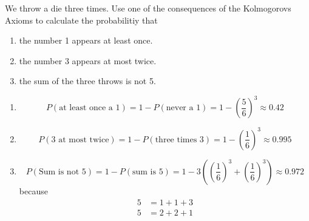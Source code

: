 \documentclass[twoside,11pt,a4paper]{article}
\newif\ifEN \ENtrue	                %
\def\tr|#1|#2|{\ifEN #2\else #1\fi}     %
\theoremstyle{definition}
\newcounter{exc}
\def\answerline#1{%
   \ifhmode\\[1ex]\fcolorbox{solbox}{solbox}{\hbox to \linewidth{\vbox to #1\baselineskip{}}}%
   \else\fcolorbox{solbox}{solbox}{\hbox to \linewidth{\vbox to #1\baselineskip{}}}%
   \fi
 }
\begin{document}
\begin{xxwrap}
\begin{exc}
\tr|Sie werfen einen Würfel dreimal. Verwenden Sie eine der Konsequenzen aus den Axiomen von Kolmogorov um die folgenden 
    Wahrscheinlichkeiten zu berechnen.
   |We throw a die three times. Use one of the  consequences of the  Kolmogorovs Axioms to calculate the probabilitiy that|
\begin{enumerate}
\item \tr|Die Zahl 1 erscheint mindestens einmal.|the number 1 appears at least once. |
\item \tr|Die Zahl 3 erscheint höchstens zweimal.|the number 3 appears at most twice.|
\item \tr|Die Summe der drei Würfe ist nicht 5.|the sum of the three throws is not 5.  |
\end{enumerate}
\end{exc}
\begin{Answer}
  \begin{enumerate}
  \item
    $$P(\text{\tr|mindestens eine 1|at least once a 1|})=
    1-P(\text{\tr|nie eine 1|never  a 1|})=1-\left(\frac56\right)^3\approx 0.42$$
  \item
    $$P(\text{\tr|3 h\"ochstens zweimal|3 at most twice|})=1-P(\text{\tr|dreimal 3|three times 3|})=1-\left(\frac16\right)^3\approx 0.995$$
  \item 
    $$P(\text{\tr|Summe ist nicht 5|Sum is not 5|})=1-P(\text{\tr|Summe ist 5|sum is 5|})=1-3\left(\left(\frac16\right)^3+\left(\frac16\right)^3\right)\approx 0.972$$
    \tr|weil|because |
    \begin{align*}
     5&=1+1+3\\ 
     5&=2+2+1 
    \end{align*}
  \end{enumerate}
\end{Answer}
\answerline{12}
\end{xxwrap}
\vfill
\end{document}
